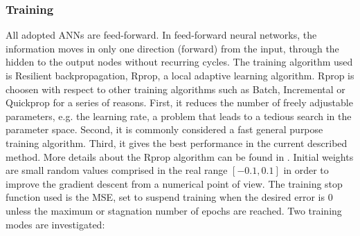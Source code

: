 \subsubsection{Training}
\label{subsubsec:training}
All adopted ANNs are feed-forward. In feed-forward neural networks, the information moves in only one direction (forward) from the input, through the hidden to the output nodes without recurring cycles. The training algorithm used is Resilient backpropagation, Rprop, a local adaptive learning algorithm. Rprop is choosen with respect to other training algorithms such as Batch, Incremental or Quickprop for a series of reasons. First, it reduces the number of freely adjustable parameters, e.g. the learning rate, a problem that leads to a tedious search in the parameter space. Second, it is commonly considered a fast general purpose training algorithm. Third, it gives the best performance in the current described method. More details about the Rprop algorithm can be found in \cite{Riedmiller1994, Riedmiller1992}. Initial weights are small random values comprised in the real range $[-0.1, 0.1]$ in order to improve the gradient descent from a numerical point of view. The training stop function used is the MSE, set to suspend training when the desired error is 0 unless the maximum or stagnation number of epochs are reached. 
Two training modes are investigated: 
